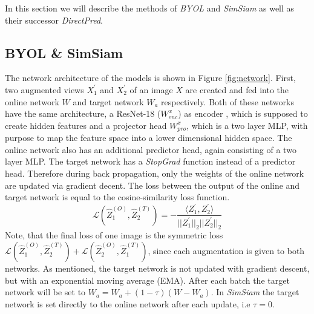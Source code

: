 \label{sec:method}
In this section we will describe the methods of \emph{BYOL} and \emph{SimSiam} as well as their successor \emph{DirectPred}.

\subsection{BYOL \& SimSiam}
\label{sec:BYOL}
The network architecture of the models is shown in Figure \ref{fig:network}. First, two augmented views $X^{\prime}_1$ and $X^{\prime}_2$ of an image $X$ are created and fed into the online network $W$ and target network $W_a$ respectively. Both of these networks have the same architecture, a ResNet-18 ($W^{x}_{enc}$) as encoder \cite{he2015deep}, which is supposed to create hidden features and a projector head $W^{x}_{pro}$, which is a two layer MLP, with purpose to map the feature space into a lower dimensional hidden space. The online network also has an additional predictor head, again consisting of a two layer MLP. The target network has a \emph{StopGrad} function instead of a predictor head. Therefore during back propagation, only the weights of the online network are updated via gradient decent. The loss between the output of the online and target network is equal to the cosine-similarity loss function.
\begin{equation}
    \mathcal{L}(\hat{Z}^{(O)}_1, \hat{Z}^{(T)}_2) = -\frac{\langle Z^{\prime}_1, Z^{\prime}_2 \rangle}{||Z^{\prime}_1 ||_2 ||Z^{\prime}_2 ||_2}
\end{equation}
Note, that the final loss of one image is the symmetric loss $\mathcal{L}(\hat{Z}^{(O)}_1, \hat{Z}^{(T)}_2) + \mathcal{L}(\hat{Z}^{(O)}_2, \hat{Z}^{(T)}_1)$, since each augmentation is given to both networks. As mentioned, the target network is not updated with gradient descent, but with an exponential moving average (EMA). After each batch the target network will be set to $W_a = W_a + (1-\tau)(W - W_a)$. In \emph{SimSiam} the target network is set directly to the online network after each update, i.e $\tau = 0$.

